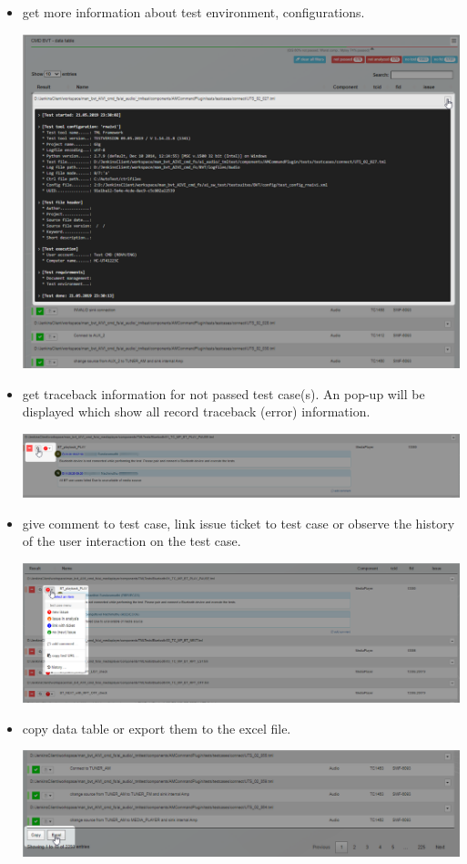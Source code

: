 \begin{itemize}
   \item get more information about test environment, configurations.
   
         \includegraphics[width=0.6\linewidth]
         {./pictures/datatable/testcase_detail.png}

   \item get traceback information for not passed test case(s). An pop-up will 
         be displayed which show all record traceback (error) information.

         \includegraphics[width=0.6\linewidth]
         {./pictures/datatable/testcase_traceback.png}

   \item give comment to test case, link issue ticket to test case or observe
         the history of the user interaction on the test case.

         \includegraphics[width=0.6\linewidth]
         {./pictures/datatable/testcase_menu.png}

   \item copy data table or export them to the excel file.

         \includegraphics[width=0.6\linewidth]
         {./pictures/datatable/copy_export.png}
\end{itemize}


